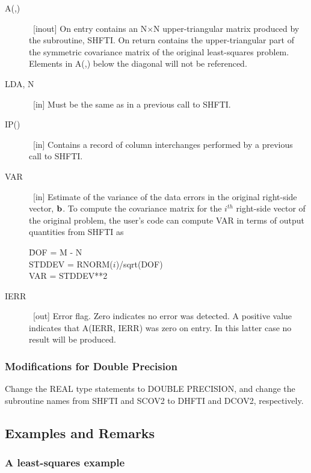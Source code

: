 \documentclass[twoside]{MATH77}
\begin{document}
\begin{description}
\item[A(,)]  \ [inout] On entry contains an N$\times $N upper-triangular
matrix produced by the subroutine, SHFTI. On return contains the
upper-triangular part of the symmetric covariance matrix of the original
least-squares problem. Elements in A(,) below the diagonal will not be
referenced.

\item[LDA, N]  \ [in] Must be the same as in a previous call to SHFTI.

\item[IP()]  \ [in] Contains a record of column interchanges performed by a
previous call to SHFTI.

\item[VAR]  \ [in] Estimate of the variance of the data errors in the
original right-side vector, ${\bf b}$. To compute the covariance matrix for
the $i^{th}$ right-side vector of the original problem, the user's code can
compute VAR in terms of output quantities from SHFTI as
{\tt \begin{tabbing}
\hspace{.2in}\=DOF = M - N\\
\>STDDEV = RNORM($i$)/sqrt(DOF)\\
\>VAR = STDDEV**2
\end{tabbing}}
\item[IERR]  \ [out] Error flag. Zero indicates no error was detected. A
positive value indicates that A(IERR, IERR) was zero on entry. In this
latter case no result will be produced.
\end{description}

\subsubsection{Modifications for Double Precision}

Change the REAL type statements to DOUBLE PRECISION, and change the
subroutine names from SHFTI and SCOV2 to DHFTI and DCOV2, respectively.

\subsection{Examples and Remarks}

\subsubsection{A least-squares example}
\end{document}
